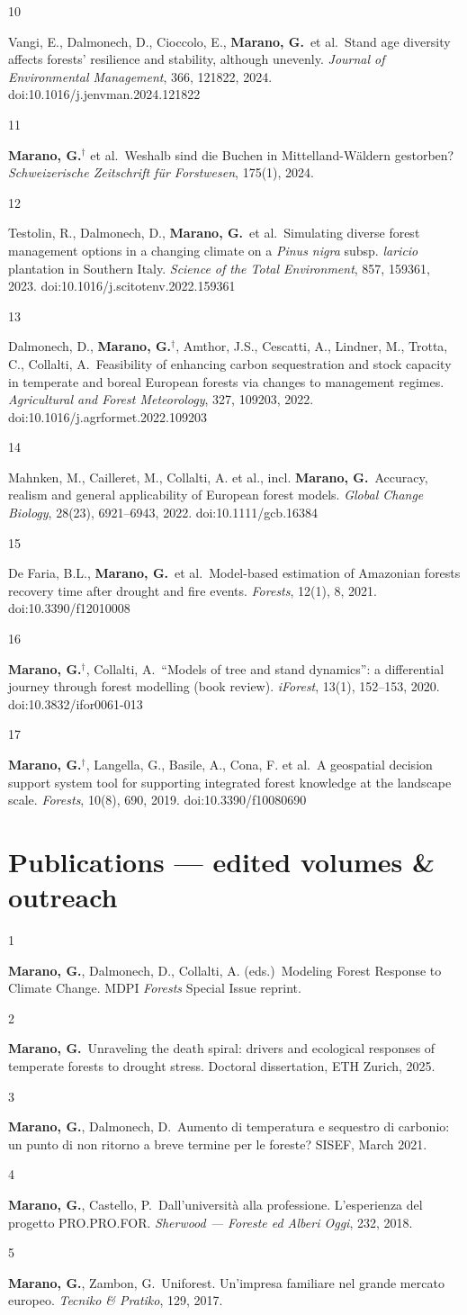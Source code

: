 \documentclass[10pt,a4paper]{article}
\newcommand{\pubitem}[3]{%
  \noindent\begin{minipage}[t]{0.6cm}\raggedright\footnotesize\color{muted}#1\end{minipage}%
  \begin{minipage}[t]{\dimexpr\linewidth-0.6cm\relax}\raggedright\small #2\ {\color{inksoft}#3}\end{minipage}\par\vspace{4pt}}
\newcommand{\me}{\textbf{Marano, G.}}
\begin{document}
\pubitem{10}{Vangi, E., Dalmonech, D., Cioccolo, E., \me\ et al.}{Stand age diversity affects forests' resilience and stability, although unevenly. \emph{Journal of Environmental Management}, 366, 121822, 2024. doi:10.1016/j.jenvman.2024.121822}
\pubitem{11}{\me$^{\dagger}$ et al.}{Weshalb sind die Buchen in Mittelland-W\"aldern gestorben? \emph{Schweizerische Zeitschrift f\"ur Forstwesen}, 175(1), 2024.}
\pubitem{12}{Testolin, R., Dalmonech, D., \me\ et al.}{Simulating diverse forest management options in a changing climate on a \emph{Pinus nigra} subsp. \emph{laricio} plantation in Southern Italy. \emph{Science of the Total Environment}, 857, 159361, 2023. doi:10.1016/j.scitotenv.2022.159361}
\pubitem{13}{Dalmonech, D., \me$^{\dagger}$, Amthor, J.S., Cescatti, A., Lindner, M., Trotta, C., Collalti, A.}{Feasibility of enhancing carbon sequestration and stock capacity in temperate and boreal European forests via changes to management regimes. \emph{Agricultural and Forest Meteorology}, 327, 109203, 2022. doi:10.1016/j.agrformet.2022.109203}
\pubitem{14}{Mahnken, M., Cailleret, M., Collalti, A. et al., incl. \me}{Accuracy, realism and general applicability of European forest models. \emph{Global Change Biology}, 28(23), 6921--6943, 2022. doi:10.1111/gcb.16384}
\pubitem{15}{De Faria, B.L., \me\ et al.}{Model-based estimation of Amazonian forests recovery time after drought and fire events. \emph{Forests}, 12(1), 8, 2021. doi:10.3390/f12010008}
\pubitem{16}{\me$^{\dagger}$, Collalti, A.}{``Models of tree and stand dynamics'': a differential journey through forest modelling (book review). \emph{iForest}, 13(1), 152--153, 2020. doi:10.3832/ifor0061-013}
\pubitem{17}{\me$^{\dagger}$, Langella, G., Basile, A., Cona, F. et al.}{A geospatial decision support system tool for supporting integrated forest knowledge at the landscape scale. \emph{Forests}, 10(8), 690, 2019. doi:10.3390/f10080690}

\section*{Publications --- edited volumes \& outreach}
\pubitem{1}{\me, Dalmonech, D., Collalti, A. (eds.)}{Modeling Forest Response to Climate Change. MDPI \emph{Forests} Special Issue reprint.}
\pubitem{2}{\me}{Unraveling the death spiral: drivers and ecological responses of temperate forests to drought stress. Doctoral dissertation, ETH Zurich, 2025.}
\pubitem{3}{\me, Dalmonech, D.}{Aumento di temperatura e sequestro di carbonio: un punto di non ritorno a breve termine per le foreste? SISEF, March 2021.}
\pubitem{4}{\me, Castello, P.}{Dall'universit\`a alla professione. L'esperienza del progetto PRO.PRO.FOR. \emph{Sherwood --- Foreste ed Alberi Oggi}, 232, 2018.}
\pubitem{5}{\me, Zambon, G.}{Uniforest. Un'impresa familiare nel grande mercato europeo. \emph{Tecniko \& Pratiko}, 129, 2017.}
\end{document}
